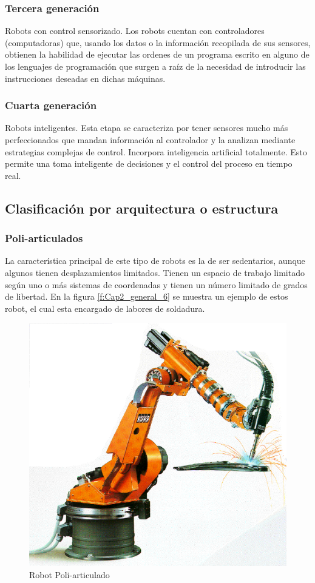         \subsubsection{Tercera generación}
            Robots con control sensorizado. Los robots cuentan con controladores (computadoras) que, usando los datos o la información recopilada de sus sensores, obtienen la habilidad de ejecutar las ordenes de un programa escrito en alguno de los lenguajes de programación que surgen a raíz de la necesidad de introducir las instrucciones deseadas en dichas máquinas. 
        \subsubsection{Cuarta generación}
            Robots inteligentes. Esta etapa se caracteriza por tener sensores mucho más perfeccionados que mandan información al controlador y la analizan mediante estrategias complejas de control. Incorpora inteligencia artificial totalmente. Esto permite una toma inteligente de decisiones y el control del proceso en tiempo real.

        \newpage
        
    \subsection{Clasificación por arquitectura o estructura}
        
        \subsubsection{Poli-articulados}
        La característica principal de este tipo de robots es la de ser sedentarios, aunque algunos tienen desplazamientos limitados. Tienen un espacio de trabajo limitado según uno o más sistemas de coordenadas y tienen un número limitado de grados de libertad. En la figura \eqref{f:Cap2_general_6} se muestra un ejemplo de estos robot, el cual esta encargado de labores de soldadura.
        
        \begin{figure}[htb]
            \centering
            \includegraphics[width=0.35\linewidth]{Main/Chapter2/Images2/Robot-poliarticulado.png}
            \caption{Robot Poli-articulado \cite{ER4pc}}
            \label{f:Cap2_general_6}
        \end{figure}
        
